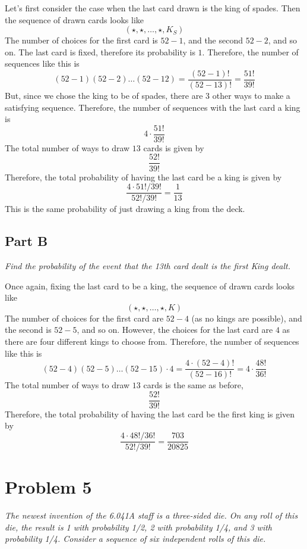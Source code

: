 \documentclass{article}
\begin{document}
Let's first consider the case when the last card drawn is the king of spades.
Then the sequence of drawn cards looks like
$$ ( \star, \star, \ldots, \star, K_S ) $$
The number of choices for the first card is $ 52 - 1 $, and the second $ 52 -
2 $, and so on. The last card is fixed, therefore its probability is $ 1 $.
Therefore, the number of sequences like this is
$$ (52 - 1)(52 - 2) \ldots (52 - 12) = \frac{(52 - 1)!}{(52 - 13)!} =
\frac{51!}{39!} $$
But, since we chose the king to be of spades, there are 3 other ways to make
a satisfying sequence. Therefore, the number of sequences with the last card
a king is
$$ 4 \cdot \frac{51!}{39!} $$
The total number of ways to draw $ 13 $ cards is given by
$$ \frac{52!}{39!} $$
Therefore, the total probability of having the last card be a king is given by
$$ \frac{4 \cdot 51! / 39!}{52! / 39!} = \frac{1}{13} $$
This is the same probability of just drawing a king from the deck.

\subsection*{Part B}

\textit{Find the probability of the event that the 13th card dealt is the
first King dealt.}

\bigbreak

Once again, fixing the last card to be a king, the sequence of drawn cards
looks like
$$ ( \star, \star, \ldots, \star, K) $$
The number of choices for the first card are $ 52 - 4 $ (as no kings are
possible), and the second is $ 52 - 5 $, and so on. However, the choices for
the last card are $ 4 $ as there are four different kings to choose from.
Therefore, the number of sequences like this is
$$ (52 - 4) (52 - 5) \ldots (52 - 15) \cdot 4 = \frac{4 \cdot (52 - 4)!}{(52
- 16)!} = 4 \cdot \frac{48!}{36!} $$
The total number of ways to draw $ 13 $ cards is the same as before,
$$ \frac{52!}{39!} $$
Therefore, the total probability of having the last card be the first king is
given by
$$ \frac{ 4 \cdot 48! / 36!}{52! / 39!} = \frac{703}{20825} $$

\section*{Problem 5}

\textit{The newest invention of the 6.041A staff is a three-sided die. On any
roll of this die, the result is 1 with probability 1/2, 2 with probability
1/4, and 3 with probability 1/4. Consider a sequence of six independent rolls
of this die.}
\end{document}
